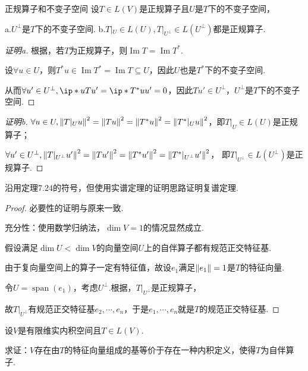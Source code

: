 \newpage

\begin{problem}[20*]\label{7.B.20*} 正规算子和不变子空间 \:
    设\(T \in L(V)\)是正规算子且\(U\)是\(T\)下的不变子空间，

    a.\(U^\bot\)是\(T\)下的不变子空间. \quad
    b.\(T|_U \in L(U),T|_{U^\bot} \in L(U^\bot)\)都是正规算子.
\end{problem}

\begin{proof}[证明a]
    根据，若\(T\)为正规算子，则\(\operatorname{Im} T=\operatorname{Im} T^*\).

    设\(\forall u \in U\)，则\(T^*u \in \operatorname{Im} T^*=\operatorname{Im} T \subseteq U\)，因此\(U\)也是\(T^*\)下的不变子空间.
    
    从而\(\forall u' \in U^\bot,\ip*{u}{Tu'}=\ip*{T^*u}{u'}=0\)，因此\(Tu' \in U^\bot\)，\(U^\bot\)是\(T\)下的不变子空间.
\end{proof}

\begin{proof}[证明b]
    \(\forall u \in U,\norm*{T|_U u}^2=\norm*{Tu}^2=\norm*{T^*u}^2=\norm*{T^*|_U u}^2\)，即\(T|_U \in L(U)\)是正规算子；

    \(\forall u' \in U^\bot,\norm*{T|_{U^\bot}u'}^2=\norm*{Tu'}^2=\norm*{T^*u'}^2=\norm*{T^*|_{U^\bot}u'}^2\)，
    即\(T|_{U^\bot} \in L(U^\bot)\)是正规算子.
\end{proof}

\begin{problem}[13]\label{7.B.13}
    沿用定理7.24的符号，但使用实谱定理的证明思路证明复谱定理.
\end{problem}

\begin{proof}
    必要性的证明与原来一致.

    充分性：使用数学归纳法，\(\dim V=1\)的情况显然成立.
    
    假设满足\(\dim U<\dim V\)的向量空间\(U\)上的自伴算子都有规范正交特征基.
    
    由于复向量空间上的算子一定有特征值，故设\(e_1\)满足\(\norm*{e_1}=1\)是\(T\)的特征向量.
    
    令\(U=\operatorname{span}(e_1)\)，考虑\(U^\bot\).根据，\(T|_{U^\bot}\)是正规算子，
    
    故\(T|_{U^\bot}\)有规范正交特征基\(e_2,\cdots,e_n\)，于是\(e_1,\cdots,e_n\)就是\(T\)的规范正交特征基.
\end{proof}

\begin{problem}[14]\label{7.B.14}
    设\(V\)是有限维实内积空间且\(T \in L(V)\).

    求证：\(V\)存在由\(T\)的特征向量组成的基等价于存在一种内积定义，使得\(T\)为自伴算子.
\end{problem}

